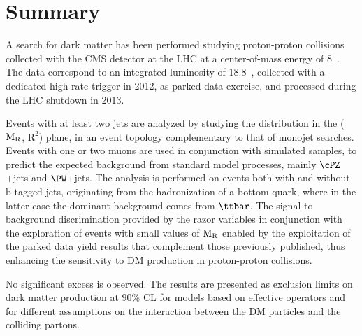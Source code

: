 {{{%

\section{Summary}\label{sec:conclusions}

A search for dark matter has been performed studying proton-proton collisions collected
with the CMS detector at the LHC at a center-of-mass energy of
$8$~\TeV. The data correspond to an integrated luminosity of
$18.8$~\fbinv, collected with a dedicated high-rate trigger in 2012,
as parked data exercise, and processed during the LHC shutdown
in 2013.

Events with at least two jets are analyzed by studying the
distribution in the ($\mathrm{M_{\rm R}}$, $\mathrm{R}^2$) plane, in an
event topology complementary to that of monojet searches. Events with one or
two muons are used in conjunction with simulated samples, to predict
the expected background from standard model processes, mainly
$\cPZ$+jets and $\PW$+jets. The analysis is performed on events both
with and without b-tagged jets, originating from the hadronization of
a bottom quark, where in the latter case the dominant background comes from
$\ttbar$. The signal to background discrimination provided by the razor variables in conjunction with the exploration of events with small values of $\mathrm{M_{\rm R}}$ enabled by the exploitation of the parked data yield results that complement those previously published, thus enhancing the sensitivity to DM production in proton-proton collisions.

No significant excess is observed. The results are presented as
exclusion limits on dark matter production at 90\% CL for models based
on effective operators and for different assumptions on the
interaction between the DM particles and the colliding partons.

}}}
